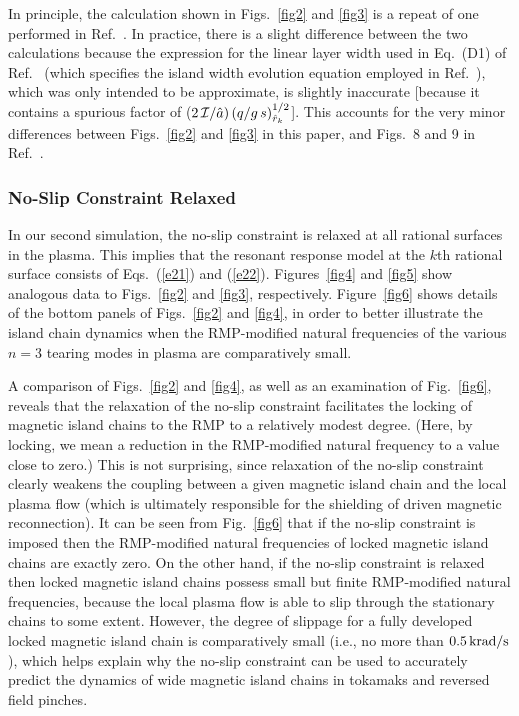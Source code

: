 \documentclass[12pt,prb,aps]{revtex4-1}
\begin{document}
In principle, the calculation shown in Figs.~\ref{fig2} and \ref{fig3} is a repeat of one performed in Ref.~. In practice, there is a slight difference between
the two calculations because the expression for the linear layer width used in Eq.~(D1) of Ref.~ (which specifies the island width evolution
equation employed in Ref.~), which was only intended to be approximate,  is slightly inaccurate [because it contains a spurious factor of ($2\,{\cal I}/\hat{a})\,(q/g\,s)^{1/2}_{\hat{r}_k}$]. This accounts for the very minor differences between Figs.~\ref{fig2} and \ref{fig3} in this
paper, and Figs.~8 and 9 in Ref.~. 

\subsubsection{No-Slip Constraint Relaxed}
In our second simulation, the no-slip constraint is relaxed at all rational surfaces in the plasma. This implies that the resonant response
model at the $k$th rational surface consists of Eqs.~(\ref{e21}) and (\ref{e22}). Figures~\ref{fig4} and \ref{fig5} show analogous 
data to Figs.~\ref{fig2} and \ref{fig3}, respectively. Figure~\ref{fig6} shows details of the bottom panels of Figs.~\ref{fig2} and \ref{fig4},
in order to better illustrate the island chain dynamics when the  RMP-modified natural frequencies of the various $n=3$ tearing modes in  plasma
are comparatively small. 

A comparison of Figs.~\ref{fig2} and \ref{fig4}, as well as an examination of Fig.~\ref{fig6}, reveals that the relaxation of the
no-slip constraint facilitates the locking of magnetic island chains to the RMP to a relatively modest degree. (Here, by locking, we mean a reduction in the
RMP-modified natural frequency to a value close to zero.) 
This is not surprising, since
relaxation of the no-slip constraint clearly weakens the coupling between a given magnetic island chain and the local plasma flow (which is ultimately responsible
for the shielding of driven magnetic reconnection). 
It can be seen from Fig.~\ref{fig6} that if the no-slip constraint is imposed then the RMP-modified natural frequencies of locked magnetic
island chains are exactly zero. On the other hand, if the no-slip constraint is relaxed then locked magnetic island chains possess
 small but finite RMP-modified natural frequencies, because the local plasma flow is able to slip through the  stationary chains to some
 extent. However, the degree of slippage for a fully developed locked magnetic island chain is comparatively small (i.e., no more than
 $0.5\,{\rm krad/s}$), which helps explain
 why the no-slip constraint can be used to accurately predict the dynamics of wide magnetic island chains in tokamaks and reversed field pinches.\cite{rfp} 
\end{document}
